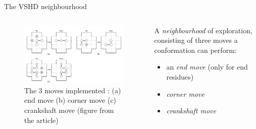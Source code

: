 \documentclass[presentation]{beamer}
\begin{document}
\begin{frame}[label={sec:org86d4f4a}]{The VSHD neighbourhood}
\begin{columns}
\begin{column}{.6\columnwidth}
\begin{figure}[htbp]
\centering
\includegraphics[width=200px]{./vshd.png}
\caption{\label{fig:moves}The 3 moves implemented : (a) end move (b) corner move (c) crankshaft move (figure from the article)}
\end{figure}
\end{column}

\begin{column}{.3\columnwidth}
\begin{definition}[VSHD]
A \emph{neighbourhood} of exploration, consisting of three moves a conformation can perform:
\begin{itemize}
\item an \emph{end move} (only for end residues)
\pause
\item \emph{corner move}
\pause
\item \emph{crankshaft move}
\end{itemize}
\end{definition}
\end{column}
\end{columns}
\end{frame}
\end{document}
